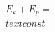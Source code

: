 \documentclass[preview]{standalone}
\begin{document}
\begin{align*}
E_k + E_p = \\text{const}
\end{align*}
\end{document}
